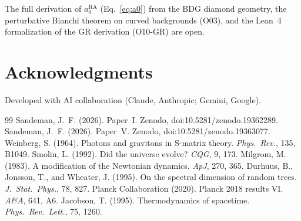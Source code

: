 \documentclass[12pt,a4paper]{article}
\begin{document}
The full derivation of $a_0^{\mathrm{RA}}$ (Eq.~\ref{eq:a0}) from the BDG diamond geometry, the perturbative Bianchi theorem on curved backgrounds (O03), and the Lean~4 formalization of the GR derivation (O10-GR) are open.

\section*{Acknowledgments}
Developed with AI collaboration (Claude, Anthropic; Gemini, Google).


\begin{thebibliography}{99}
 Sandeman, J.~F. (2026). Paper~I. Zenodo, doi:10.5281/zenodo.19362289.
 Sandeman, J.~F. (2026). Paper~V. Zenodo, doi:10.5281/zenodo.19363077.
 Weinberg, S. (1964). Photons and gravitons in S-matrix theory. \textit{Phys.\ Rev.}, 135, B1049.
 Smolin, L. (1992). Did the universe evolve? \textit{CQG}, 9, 173.
 Milgrom, M. (1983). A modification of the Newtonian dynamics. \textit{ApJ}, 270, 365.
 Durhuus, B., Jonsson, T., and Wheater, J. (1995). On the spectral dimension of random trees. \textit{J.\ Stat.\ Phys.}, 78, 827.
 Planck Collaboration (2020). Planck 2018 results VI. \textit{A\&A}, 641, A6.
 Jacobson, T. (1995). Thermodynamics of spacetime. \textit{Phys.\ Rev.\ Lett.}, 75, 1260.
\end{thebibliography}
\end{document}
